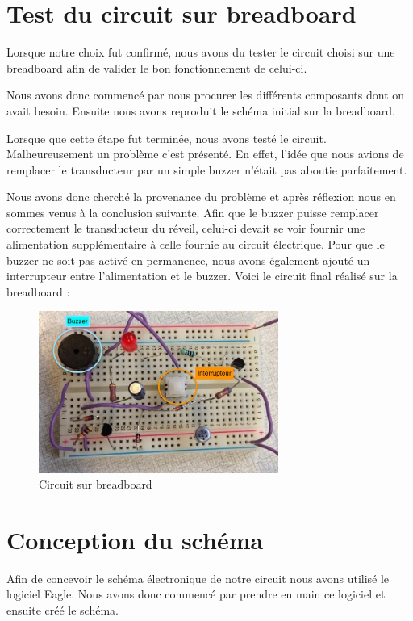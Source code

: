 \chapter{Test du circuit sur breadboard}

Lorsque notre choix fut confirmé, nous avons du tester le circuit choisi sur une breadboard afin de valider le bon fonctionnement de celui-ci. 

Nous avons donc commencé par nous procurer les différents composants dont on avait besoin. Ensuite nous avons reproduit le schéma initial sur la breadboard.

Lorsque que cette étape fut terminée, nous avons testé le circuit. Malheureusement un problème c'est présenté. En effet, l'idée que nous avions de remplacer le transducteur par un simple buzzer n'était pas aboutie parfaitement. 

Nous avons donc cherché la provenance du problème et après réflexion nous en sommes venus à la conclusion suivante. Afin que le buzzer puisse remplacer correctement le transducteur du réveil, celui-ci devait se voir fournir une alimentation supplémentaire à celle fournie au circuit électrique. Pour que le buzzer ne soit pas activé en permanence, nous avons également ajouté un interrupteur entre l'alimentation et le buzzer. Voici le circuit final réalisé sur la breadboard : 

\begin{figure}[H]
\centering
\includegraphics[width=0.7\textwidth]{ressources/breadboardElement}
\caption{Circuit sur breadboard}
\end{figure}

\chapter{Conception du schéma}

Afin de concevoir le schéma électronique de notre circuit nous avons utilisé le logiciel Eagle. Nous avons donc commencé par prendre en main ce logiciel et ensuite créé le schéma.  

